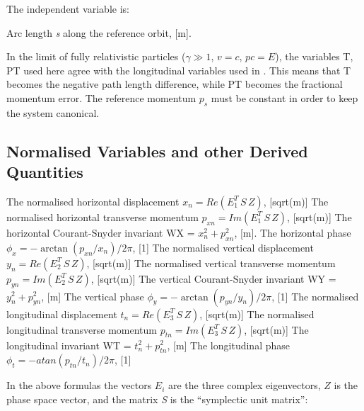 The independent variable is: 
\begin{madlist}
    Arc length \textit{s} along the reference orbit, [m].   
\end{madlist} 

In the limit of fully relativistic particles ($\gamma \gg 1$, $v = c$,
$p c = E$), the variables T, PT used here agree with the
longitudinal variables used in \cite{TRANSPORT}. This means that T
becomes the negative path length difference, while PT becomes the
fractional momentum error. The reference momentum $p_s$ must be
constant in order to keep the system canonical.  

\subsection{Normalised Variables and other Derived Quantities}
\label{subsec:tables_normal}
\begin{madlist}
   The normalised horizontal displacement \quad
  $x_n = Re ( E_1^T \, S\, Z )$, [sqrt(m)]
   The normalised horizontal transverse momentum \quad
  $p_{xn} = Im ( E_1^T\, S\, Z )$, [sqrt(m)]
   The horizontal Courant-Snyder invariant \quad
  WX = $x_n^2 + p_{xn}^2$, [m].    
   The horizontal phase \quad
  $\phi_x = -\arctan ( p_{xn} / x_n ) / 2 \pi$, [1]
   The normalised vertical displacement \quad 
  $y_n = Re ( E_2^T \,S\, Z )$, [sqrt(m)]
   The normalised vertical transverse momentum \quad
  $p_{yn} = Im ( E_2^T\, S\, Z )$, [sqrt(m)]
   The vertical Courant-Snyder invariant \quad
  WY = $y_n^2 + p_{yn}^2$, [m]
   The vertical phase \quad
  $\phi_y = -\arctan ( p_{yn} / y_n ) / 2 \pi$, [1]
   The normalised longitudinal displacement \quad
  $t_n = Re ( E_3^T \,S\, Z )$, [sqrt(m)]
   The normalised longitudinal transverse momentum \quad
  $p_{tn} = Im ( E_3^T\, S\, Z )$, [sqrt(m)]
   The longitudinal invariant \quad
  WT = $t_n^2 + p_{tn}^2$, [m]
   The longitudinal phase \quad
  $\phi_t = - atan ( p_{tn} / t_n ) / 2 \pi$, [1]
\end{madlist} 

In the above formulas the vectors \(E_i\) are the three complex
eigenvectors, \(Z\) is the phase space vector, and the matrix \textit{S}
is the ``symplectic unit matrix'':   


